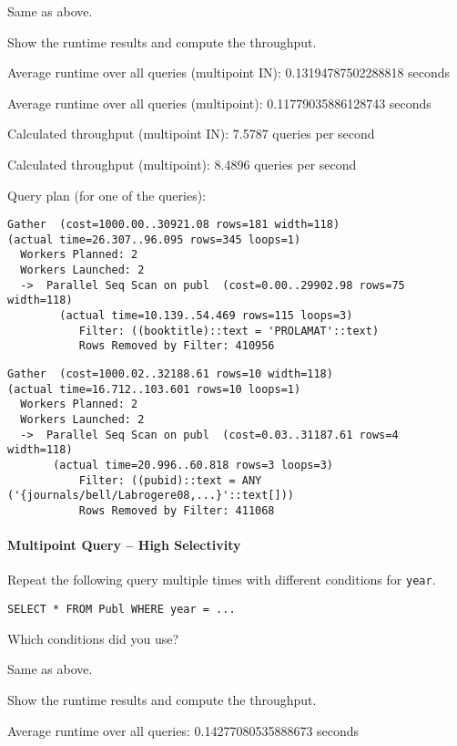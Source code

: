 \documentclass[11pt]{scrartcl}
\begin{document}
Same as above.

Show the runtime results and compute the throughput.

Average runtime over all queries (multipoint IN): 0.13194787502288818 seconds

Average runtime over all queries (multipoint): 0.11779035886128743 seconds

Calculated throughput (multipoint IN): 7.5787 queries per second

Calculated throughput (multipoint): 8.4896 queries per second

Query plan (for one of the queries):

{\small
\parskip0pt\begin{verbatim}
Gather  (cost=1000.00..30921.08 rows=181 width=118) 
(actual time=26.307..96.095 rows=345 loops=1)
  Workers Planned: 2
  Workers Launched: 2
  ->  Parallel Seq Scan on publ  (cost=0.00..29902.98 rows=75 width=118) 
        (actual time=10.139..54.469 rows=115 loops=3)
           Filter: ((booktitle)::text = 'PROLAMAT'::text)
           Rows Removed by Filter: 410956
\end{verbatim}}

{\small
\parskip0pt\begin{verbatim}
Gather  (cost=1000.02..32188.61 rows=10 width=118) 
(actual time=16.712..103.601 rows=10 loops=1)
  Workers Planned: 2
  Workers Launched: 2
  ->  Parallel Seq Scan on publ  (cost=0.03..31187.61 rows=4 width=118) 
       (actual time=20.996..60.818 rows=3 loops=3)
           Filter: ((pubid)::text = ANY ('{journals/bell/Labrogere08,...}'::text[]))
           Rows Removed by Filter: 411068
\end{verbatim}}

\paragraph{Multipoint Query -- High Selectivity}

Repeat the following query multiple times with different conditions for \texttt{year}.

\begin{lstlisting}[style=dbtsql]
SELECT * FROM Publ WHERE year = ...
\end{lstlisting}

Which conditions did you use?

Same as above.

Show the runtime results and compute the throughput.

Average runtime over all queries: 0.14277080535888673 seconds
\end{document}
